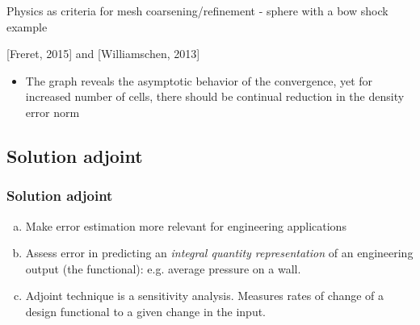 \documentclass{beamer}
\begin{document}
\begin{frame}
\begin{minipage}[t][1\textheight]{1\textwidth}
\begin{exampleblock}{Physics as criteria for mesh coarsening/refinement - sphere with a bow shock example}
\begin{figure}
\end{figure}

[Freret, 2015] and [Williamschen, 2013]
\begin{itemize}
\item The graph reveals the asymptotic behavior of the convergence, yet for increased number of cells, there should be continual reduction in the density error norm
\end{itemize}
\end{exampleblock}
\end{minipage}

\end{frame}



\subsection[Adjoint]{Solution adjoint}
\begin{frame}%
\frametitle{Solution adjoint}
\begin{enumerate}[(a)]
\scriptsize
\item Make error estimation more relevant for engineering applications
\item Assess error in predicting an \textit{integral quantity representation} of an engineering output (the functional): e.g. average pressure on a wall. 
\item Adjoint technique is a sensitivity analysis. Measures rates of change of a design functional to a given change in the input. 
\end{enumerate}
\end{frame}
\end{document}
